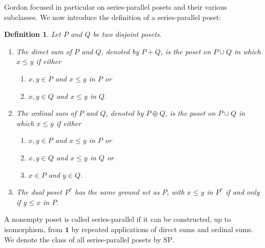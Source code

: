 \documentclass[10pt,a4paper]{amsart}
\newtheorem{definition}{Definition}[section]
\begin{document}
Gordon \cite{Gordon1993} focused in particular on series-parallel posets
and their various subclasses.
We now introduce the definition of a series-parallel poset:


\begin{definition}\label{def:poset-sums-dual}
Let $P$ and $Q$ be two disjoint posets.
\begin{enumerate}
\item The direct sum of $P$ and $Q$, denoted by $P+Q$, is the poset
on $P\cup Q$ in which $x\le y$ if either
\begin{enumerate}
    \item[\textup{(i)}] $x,y\in P$ and $x\le y$ in $P$ or
    \item[\textup{(ii)}] $x,y\in Q$ and $x\le y$ in $Q$.
\end{enumerate}

\item The ordinal sum of $P$ and $Q$, denoted by $P\oplus Q$, is the poset
on $P\cup Q$ in which $x\le y$ if either
\begin{enumerate}
    \item[\textup{(i)}] $x,y\in P$ and $x\le y$ in $P$ or
    \item[\textup{(ii)}] $x,y\in Q$ and $x\le y$ in $Q$ or
    \item[\textup{(iii)}] $x\in P$ and $y\in Q$.
\end{enumerate}

\item The dual poset $P^*$ has the same ground set as $P$, with
$x\le y$ in $P^*$ if and only if $y\le x$ in $P$.
\end{enumerate}
\end{definition}



A nonempty poset is called series-parallel if it can be constructed,
up to isomorphism, from $\mathbf1$ by repeated applications of direct sums
and ordinal sums.
We denote the class of all series-parallel posets by $\mathrm{SP}$.
\end{document}
